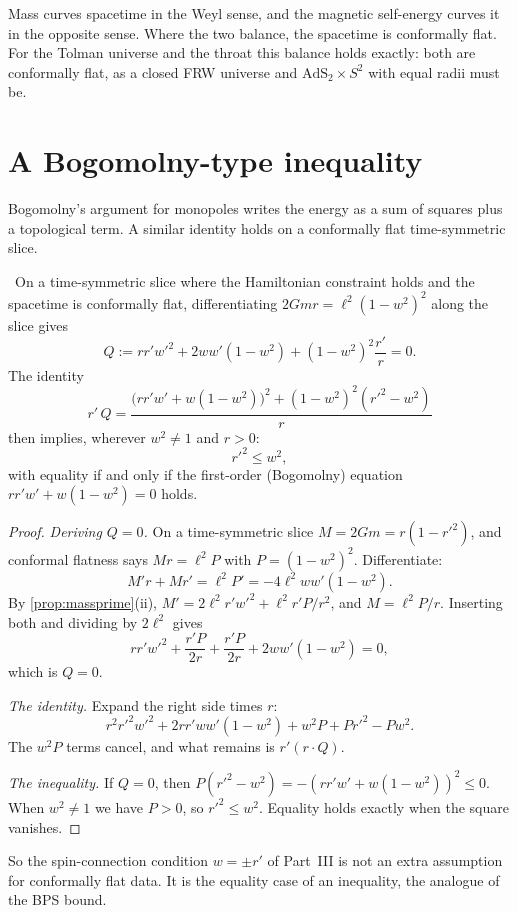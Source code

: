 Mass curves spacetime in the Weyl sense, and the magnetic self-energy curves it in the opposite sense. Where the two balance, the spacetime is conformally flat. For the Tolman universe and the throat this balance holds exactly: both are conformally flat, as a closed FRW universe and $\mathrm{AdS}_2\times S^2$ with equal radii must be.

\section{A Bogomolny-type inequality}

Bogomolny's argument for monopoles writes the energy as a sum of squares plus a topological term. A similar identity holds on a conformally flat time-symmetric slice.

\begin{theorem}[$r'^2\le w^2$]\label{thm:bogomolny}\ver\
On a time-symmetric slice where the Hamiltonian constraint holds and the spacetime is conformally flat, differentiating $2Gmr=\ell^2(1-w^2)^2$ along the slice gives
\[
Q:=rr'w'^2+2ww'(1-w^2)+(1-w^2)^2\frac{r'}{r}=0 .
\]
The identity
\[
r'\,Q=\frac{\bigl(rr'w'+w(1-w^2)\bigr)^2+(1-w^2)^2(r'^2-w^2)}{r}
\]
then implies, wherever $w^2\ne1$ and $r>0$:
\[
r'^2\le w^2,
\]
with equality if and only if the first-order (Bogomolny) equation $rr'w'+w(1-w^2)=0$ holds.
\end{theorem}
\begin{proof}
\emph{Deriving $Q=0$.} On a time-symmetric slice $M=2Gm=r(1-r'^2)$, and conformal flatness says $Mr=\ell^2P$ with $P=(1-w^2)^2$. Differentiate:
\[
M'r+Mr'=\ell^2P'=-4\ell^2ww'(1-w^2).
\]
By \cref{prop:massprime}(ii), $M'=2\ell^2r'w'^2+\ell^2r'P/r^2$, and $M=\ell^2P/r$. Inserting both and dividing by $2\ell^2$ gives
\[
rr'w'^2+\frac{r'P}{2r}+\frac{r'P}{2r}+2ww'(1-w^2)=0 ,
\]
which is $Q=0$.

\emph{The identity.} Expand the right side times $r$:
\[
r^2r'^2w'^2+2rr'ww'(1-w^2)+w^2P+Pr'^2-Pw^2 .
\]
The $w^2P$ terms cancel, and what remains is $r'(r\cdot Q)$.

\emph{The inequality.} If $Q=0$, then $P(r'^2-w^2)=-(rr'w'+w(1-w^2))^2\le0$. When $w^2\ne1$ we have $P>0$, so $r'^2\le w^2$. Equality holds exactly when the square vanishes.
\end{proof}


So the spin-connection condition $w=\pm r'$ of Part~III is not an extra assumption for conformally flat data. It is the equality case of an inequality, the analogue of the BPS bound.

